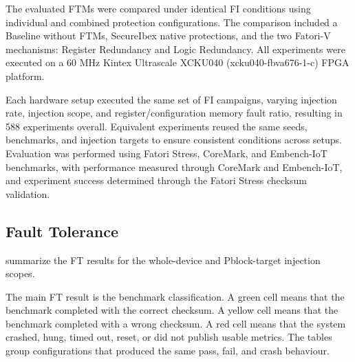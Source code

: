 

The evaluated \acp{FTM} were compared under identical \ac{FI} conditions using individual and combined protection configurations. The comparison included a Baseline without \acp{FTM}, SecureIbex native protections, and the two \ac{Fatori-V} mechanisms: Register Redundancy and Logic Redundancy. All experiments were executed on a 60 MHz Kintex Ultrascale XCKU040 \cite{xcku040} (xcku040-fbva676-1-c) \ac{FPGA} platform.

Each hardware setup executed the same set of \ac{FI} campaigns, varying injection rate, injection scope, and register/configuration memory fault ratio, resulting in 588 experiments overall. Equivalent experiments reused the same seeds, benchmarks, and injection targets to ensure consistent conditions across setups. Evaluation was performed using Fatori Stress, CoreMark, and Embench-IoT benchmarks, with performance measured through CoreMark and Embench-IoT, and experiment success determined through the Fatori Stress checksum validation.



\subsection{Fault Tolerance}


 summarize the \ac{FT} results for the whole-device and Pblock-target injection scopes.

The main \ac{FT} result is the benchmark classification. A green cell means that the benchmark completed with the correct checksum. A yellow cell means that the benchmark completed with a wrong checksum. A red cell means that the system crashed, hung, timed out, reset, or did not publish usable metrics. The tables group configurations that produced the same pass, fail, and crash behaviour.

